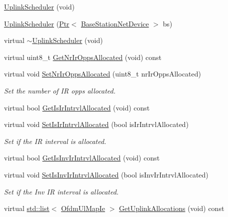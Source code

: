 \begin{DoxyCompactItemize}
\item 
\hyperlink{classns3_1_1UplinkScheduler_a49c38d7e63903d62bb825c38ba3be0fa}{Uplink\+Scheduler} (void)
\item 
\hyperlink{classns3_1_1UplinkScheduler_a84e3e3530de4345a104dfd67137af90e}{Uplink\+Scheduler} (\hyperlink{classns3_1_1Ptr}{Ptr}$<$ \hyperlink{classns3_1_1BaseStationNetDevice}{Base\+Station\+Net\+Device} $>$ bs)
\item 
virtual \hyperlink{classns3_1_1UplinkScheduler_a1ef1705a8591ba00577c39a45d0e942b}{$\sim$\+Uplink\+Scheduler} (void)
\item 
virtual uint8\+\_\+t \hyperlink{classns3_1_1UplinkScheduler_a9a2cbb04c1e84a028fc1545e8f054b80}{Get\+Nr\+Ir\+Opps\+Allocated} (void) const 
\item 
virtual void \hyperlink{classns3_1_1UplinkScheduler_a19208ce138c5e13b1a7019a67adef892}{Set\+Nr\+Ir\+Opps\+Allocated} (uint8\+\_\+t nr\+Ir\+Opps\+Allocated)
\begin{DoxyCompactList}\small\item\em Set the number of IR opps allocated. \end{DoxyCompactList}\item 
virtual bool \hyperlink{classns3_1_1UplinkScheduler_a7fad0055a2ef438330cb08440cd8a8fc}{Get\+Is\+Ir\+Intrvl\+Allocated} (void) const 
\item 
virtual void \hyperlink{classns3_1_1UplinkScheduler_a3eee0d06486678eab4d352a274676d95}{Set\+Is\+Ir\+Intrvl\+Allocated} (bool is\+Ir\+Intrvl\+Allocated)
\begin{DoxyCompactList}\small\item\em Set if the IR interval is allocated. \end{DoxyCompactList}\item 
virtual bool \hyperlink{classns3_1_1UplinkScheduler_a552e42af55b4882ea4c7996f54e0bb06}{Get\+Is\+Inv\+Ir\+Intrvl\+Allocated} (void) const 
\item 
virtual void \hyperlink{classns3_1_1UplinkScheduler_a766e3b6c032052002929eb351934e42b}{Set\+Is\+Inv\+Ir\+Intrvl\+Allocated} (bool is\+Inv\+Ir\+Intrvl\+Allocated)
\begin{DoxyCompactList}\small\item\em Set if the Inv IR interval is allocated. \end{DoxyCompactList}\item 
virtual \hyperlink{openflow-interface_8h_afd9bcfa176617760671b67580f536fa7}{std\+::list}$<$ \hyperlink{classns3_1_1OfdmUlMapIe}{Ofdm\+Ul\+Map\+Ie} $>$ \hyperlink{classns3_1_1UplinkScheduler_a7170d8d32d3af5c07febafc2c6712f8c}{Get\+Uplink\+Allocations} (void) const 

\end{DoxyCompactItemize}
